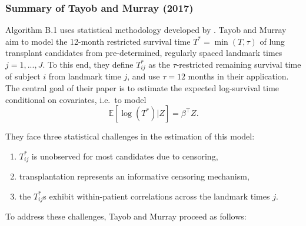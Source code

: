 \documentclass[11pt,twoside,]{book}
\providecommand{\tightlist}{%
  \setlength{\itemsep}{0pt}\setlength{\parskip}{0pt}}
\begin{document}
\subsubsection*{Summary of Tayob and Murray (2017)}\label{summary-of-tayob-and-murray-2017}

Algorithm B.1 uses statistical methodology developed by \citet{tayobstatistical2017}.
Tayob and Murray aim to model the 12-month restricted survival time \(T^* = \min(T, \tau)\)
of lung transplant candidates from pre-determined, regularly spaced landmark
times \(j = 1, ..., J\). To this end, they define
\(T^*_{ij}\) as the \(\tau\)-restricted remaining survival time of subject
\(i\) from landmark time \(j\), and use \(\tau = 12\) months in their application.
The central goal of their paper is to estimate
the expected log-survival time conditional on covariates, i.e.~to model
\[\mathbb{E}[\log(T^*) | Z] = \beta^\intercal Z.\]

They face three statistical challenges in the estimation of this model:

\begin{enumerate}
\def\labelenumi{\arabic{enumi}.}
\tightlist
\item
  \(T^*_{ij}\) is unobserved for most candidates due to censoring,
\item
  transplantation represents an informative censoring mechanism,
\item
  the \(T^*_{ij}\)s exhibit within-patient correlations across the landmark times \(j\).
\end{enumerate}

To address these challenges, Tayob and Murray proceed as follows:
\end{document}
